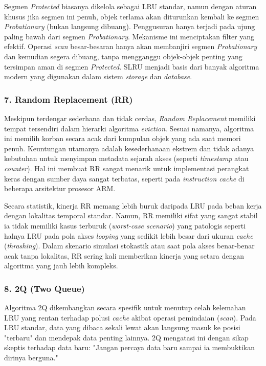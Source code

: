 Segmen \textit{Protected} biasanya dikelola sebagai LRU standar,
namun dengan aturan khusus
jika segmen ini penuh, objek terlama akan diturunkan kembali ke
segmen \textit{Probationary} (bukan langsung dibuang).
Penggusuran hanya terjadi pada ujung paling bawah dari segmen
\textit{Probationary}.
Mekanisme ini menciptakan filter yang efektif.
Operasi \textit{scan} besar-besaran hanya akan membanjiri segmen
\textit{Probationary} dan kemudian segera dibuang, tanpa mengganggu
objek-objek penting yang tersimpan aman di segmen \textit{Protected}.
SLRU menjadi basis dari banyak algoritma modern yang digunakan dalam
sistem \textit{storage} dan \textit{database}.

\subsubsection{7. Random Replacement (RR)}
Meskipun terdengar sederhana dan tidak cerdas, \textit{Random
Replacement} memiliki tempat tersendiri dalam hierarki algoritma
\textit{eviction}.
Sesuai namanya, algoritma ini memilih korban secara acak dari
kumpulan objek yang ada saat memori penuh.
Keuntungan utamanya adalah kesederhanaan ekstrem dan tidak adanya
kebutuhan untuk menyimpan metadata sejarah akses (seperti
\textit{timestamp} atau \textit{counter}).
Hal ini membuat RR sangat menarik untuk implementasi perangkat keras
dengan sumber daya sangat terbatas, seperti pada \textit{instruction
cache} di beberapa arsitektur prosesor ARM.

Secara statistik, kinerja RR memang lebih buruk daripada LRU pada
beban kerja dengan lokalitas temporal standar.
Namun, RR memiliki sifat yang sangat stabil
ia tidak memiliki kasus terburuk (\textit{worst-case scenario}) yang
patologis seperti halnya LRU pada pola akses \textit{looping} yang
sedikit lebih besar dari ukuran \textit{cache} (\textit{thrashing}).
Dalam skenario simulasi stokastik atau saat pola akses benar-benar
acak tanpa lokalitas, RR sering kali memberikan kinerja yang setara
dengan algoritma yang jauh lebih kompleks.

\subsubsection{8. 2Q (Two Queue)}
Algoritma 2Q dikembangkan secara spesifik untuk menutup celah
kelemahan LRU yang rentan terhadap polusi \textit{cache} akibat
operasi pemindaian (\textit{scan}).
Pada LRU standar, data yang dibaca sekali lewat akan langsung masuk
ke posisi "terbaru" dan mendepak data penting lainnya.
2Q mengatasi ini dengan sikap skeptis terhadap data baru: "Jangan
percaya data baru sampai ia membuktikan dirinya berguna."

